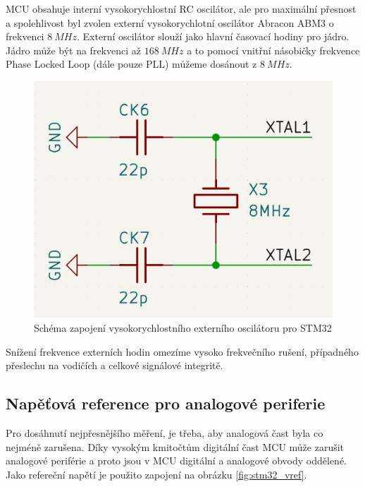 MCU obsahuje interní vysokorychlostní RC oscilátor, ale pro maximální přesnost a spolehlivost byl zvolen externí vysokorychlotní oscilátor Abracon ABM3 o frekvenci  $8 \ MHz$. Externí oscilátor slouží jako hlavní časovací hodiny pro 
jádro. Jádro může být na frekvenci až $168 \ MHz$ a to pomocí vnitřní násobičky frekvence Phase Locked Loop (dále pouze PLL) můžeme dosánout z $8 \ MHz$.

\begin{figure}[H]
    \centering
    \includegraphics[width=0.8\linewidth]{pictures/stm32_hse.jpg}
    \caption{Schéma zapojení vysokorychlostního externího oscilátoru pro STM32}
    \label{fig:stm32_hse}
\end{figure}

Snížení frekvence externích hodin omezíme vysoko frekvečního rušení, případného přeslechu na vodičích a celkové signálové integritě.


\subsection{Napěťová reference pro analogové periferie}
Pro dosáhnutí nejpřesnějšího měření, je třeba, aby analogová čast byla co nejméně zarušena. Díky vysokým kmitočtům digitální čast MCU může zarušit analogové periférie a proto jsou v MCU digitální a analogové obvody oddělené. 
Jako refereční napětí je použito zapojení na obrázku \ref{fig:stm32_vref}.

